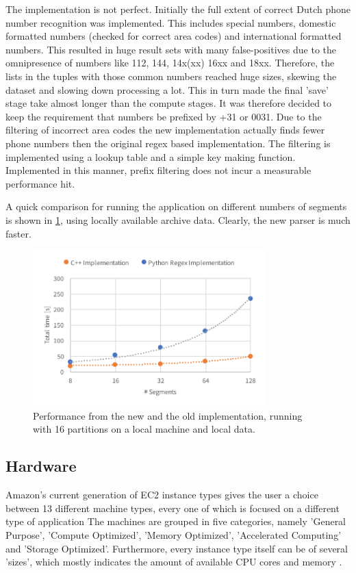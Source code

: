 \documentclass{article}
\begin{document}
The implementation is not perfect.
Initially the full extent of correct Dutch phone number recognition was implemented.
This includes special numbers, domestic formatted numbers (checked for correct area codes) and international formatted numbers.
This resulted in huge result sets with many false-positives due to the omnipresence of numbers like 112, 144, 14x(xx) 16xx and 18xx.
Therefore, the lists in the tuples with those common numbers reached huge sizes, skewing the dataset and slowing down processing a lot.
This in turn made the final 'save' stage take almost longer than the compute stages.
It was therefore decided to keep the requirement that numbers be prefixed by +31 or 0031.
Due to the filtering of incorrect area codes the new implementation actually finds fewer phone numbers then the original regex based implementation.
The filtering is implemented using a lookup table and a simple key making function.
Implemented in this manner, prefix filtering does not incur a measurable performance hit.

A quick comparison for running the application on different numbers of segments is shown in \cref{fig:impl-scaling}, using locally available archive data. Clearly, the new parser is much faster.

\begin{figure}[H]
    \centering
    \includegraphics[width=0.8\textwidth]{resource/impl-scaling.pdf}
    \caption{Performance from the new and the old implementation, running with 16 partitions on a local machine and local data.}
    \label{fig:impl-scaling}
\end{figure}

\subsection{Hardware}
Amazon's current generation of EC2 instance types gives the user a choice between 13 different machine types, every one of which is focused on a different type of application
The machines are grouped in five categories, namely 'General Purpose', 'Compute Optimized', 'Memory Optimized', 'Accelerated Computing' and 'Storage Optimized'.
Furthermore, every instance type itself can be of several 'sizes', which mostly indicates the amount of available CPU cores and memory \cite{amazon2017instance}.
\end{document}
